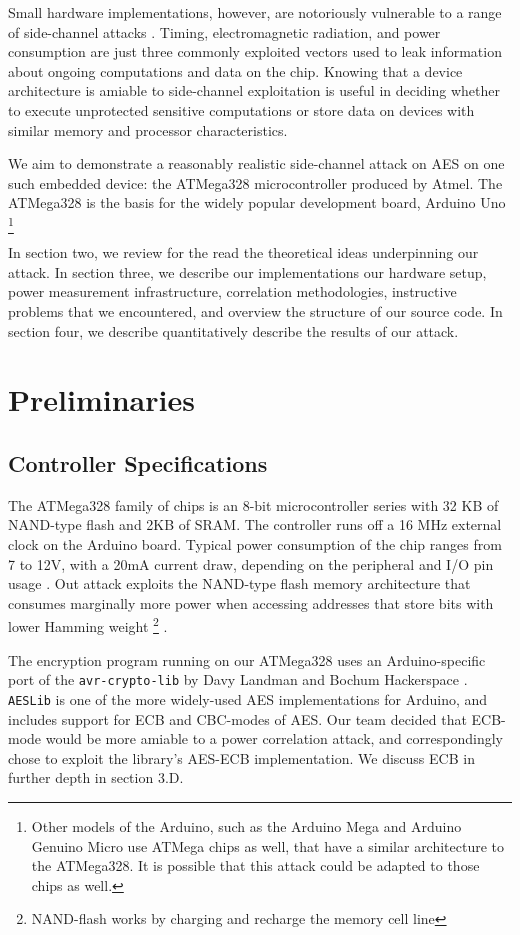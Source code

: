 \documentclass[journal]{ieee_style}
\begin{document}
Small hardware implementations, however, are notoriously vulnerable to a range of side-channel attacks \cite{smalldevice}. Timing, electromagnetic radiation, and power consumption are just three commonly exploited vectors used to leak information about ongoing computations and data on the chip. Knowing that a device architecture is amiable to side-channel exploitation is useful in deciding whether to execute unprotected sensitive computations or store data on devices with similar memory and processor characteristics.

We aim to demonstrate a reasonably realistic side-channel attack on AES on one such embedded device: the ATMega328 microcontroller produced by Atmel. The ATMega328 is the basis for the widely popular development board, Arduino Uno \footnote{Other models of the Arduino, such as the Arduino Mega and Arduino Genuino Micro use ATMega chips as well, that have a similar architecture to the ATMega328. It is possible that this attack could be adapted to those chips as well.}

In section two, we review for the read the theoretical ideas underpinning our attack. In section three, we describe our implementations our hardware setup, power measurement infrastructure, correlation methodologies, instructive problems that we encountered, and overview the structure of our source code. In section four, we describe quantitatively describe the results of our attack.

\section{Preliminaries}
\subsection{Controller Specifications}
The ATMega328 family of chips is an 8-bit microcontroller series with 32 KB of NAND-type flash and 2KB of SRAM. The controller runs off a 16 MHz external clock on the Arduino board. Typical power consumption of the chip ranges from 7 to 12V, with a 20mA current draw, depending on the peripheral and I/O pin usage \cite{atmeldatasheet}. Out attack exploits the NAND-type flash memory architecture that consumes marginally more power when accessing addresses that store bits with lower Hamming weight \footnote{NAND-flash works by charging and recharge the memory cell line} \cite{nandflash}.

The encryption program running on our ATMega328 uses an Arduino-specific port of the \texttt{avr-crypto-lib} by Davy Landman and Bochum Hackerspace \cite{AESLib} \cite{daslabor}. \texttt{AESLib} is one of the more widely-used AES implementations for Arduino, and includes support for ECB and CBC-modes of AES. Our team decided that ECB-mode would be more amiable to a power correlation attack, and correspondingly chose to exploit the library's AES-ECB implementation. We discuss ECB in further depth in section 3.D.
\end{document}
